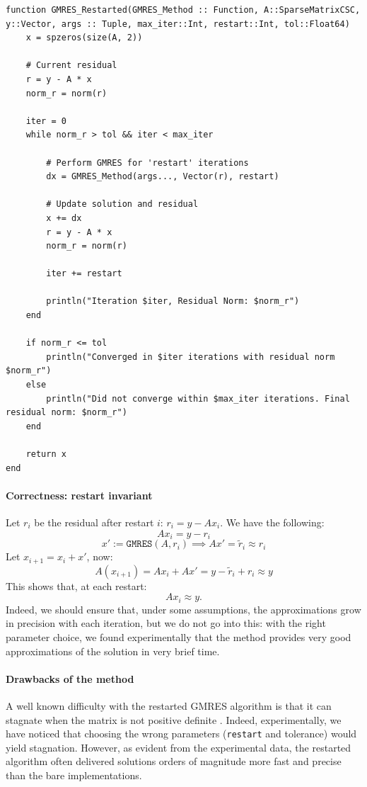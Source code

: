 \documentclass{article}
\begin{document}
\begin{lstlisting}[mathescape = False]
function GMRES_Restarted(GMRES_Method :: Function, A::SparseMatrixCSC, y::Vector, args :: Tuple, max_iter::Int, restart::Int, tol::Float64)
    x = spzeros(size(A, 2))

    # Current residual
    r = y - A * x
    norm_r = norm(r)

    iter = 0
    while norm_r > tol && iter < max_iter

        # Perform GMRES for 'restart' iterations
        dx = GMRES_Method(args..., Vector(r), restart)

        # Update solution and residual
        x += dx
        r = y - A * x
        norm_r = norm(r)

        iter += restart

        println("Iteration $iter, Residual Norm: $norm_r")
    end

    if norm_r <= tol
        println("Converged in $iter iterations with residual norm $norm_r")
    else
        println("Did not converge within $max_iter iterations. Final residual norm: $norm_r")
    end

    return x
end
\end{lstlisting}


\paragraph{Correctness: restart invariant}
 Let $r_i$ be the residual after restart $i$: $r_i = y-Ax_{i}$. We have the following:
$$Ax_i = y - r_i$$
  $$x' := \texttt{GMRES}(A,r_i) \implies Ax' = \widetilde r_i \approx r_i$$
  Let $x_{i+1} = x_i + x'$, now:
  \[A(x_{i+1}) = Ax_i + Ax' = y - \widetilde r_i + r_i \approx y\]
This shows that, at each restart:
\[A x_i \approx y.\]
Indeed, we should ensure that, under some assumptions, the approximations grow in precision with each iteration, but we do not go into this: with the right parameter choice, we found experimentally that the method provides very good approximations of the solution in very brief time.

\paragraph{Drawbacks of the method}

A well known difficulty with the restarted GMRES algorithm is that it can stagnate when the matrix is not positive definite \cite{saad2003iterative}. Indeed, experimentally, we have noticed that choosing the wrong parameters (\texttt{restart} and tolerance) would yield stagnation. However, as evident from the experimental data, the restarted algorithm often delivered solutions orders of magnitude more fast and precise than the bare implementations.
\end{document}
